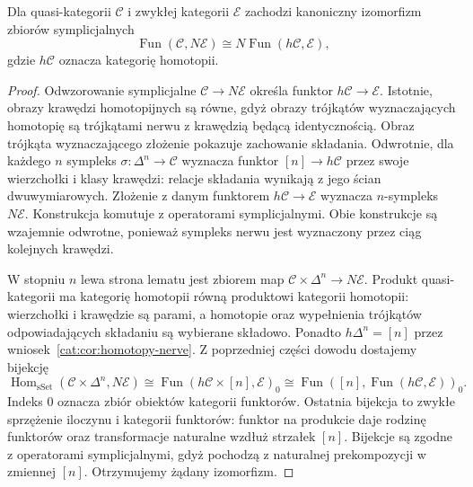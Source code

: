\begin{lemat}\label{cat:lem:infty-localization-ordinary-target}
Dla quasi-kategorii $\mathcal C$ i zwykłej kategorii $\mathcal E$ zachodzi kanoniczny izomorfizm zbiorów symplicjalnych
\[
 \operatorname{Fun}(\mathcal C,N\mathcal E)\cong
 N\operatorname{Fun}(h\mathcal C,\mathcal E),
\]
gdzie $h\mathcal C$ oznacza kategorię homotopii.
\end{lemat}
\begin{proof}
Odwzorowanie symplicjalne $\mathcal C\to N\mathcal E$ określa funktor $h\mathcal C\to\mathcal E$. Istotnie, obrazy krawędzi homotopijnych są równe, gdyż obrazy trójkątów wyznaczających homotopię są trójkątami nerwu z krawędzią będącą identycznością. Obraz trójkąta wyznaczającego złożenie pokazuje zachowanie składania. Odwrotnie, dla każdego $n$ sympleks $\sigma:\Delta^n\to\mathcal C$ wyznacza funktor $[n]\to h\mathcal C$ przez swoje wierzchołki i klasy krawędzi: relacje składania wynikają z jego ścian dwuwymiarowych. Złożenie z danym funktorem $h\mathcal C\to\mathcal E$ wyznacza $n$-sympleks $N\mathcal E$. Konstrukcja komutuje z operatorami symplicjalnymi. Obie konstrukcje są wzajemnie odwrotne, ponieważ sympleks nerwu jest wyznaczony przez ciąg kolejnych krawędzi.

W stopniu $n$ lewa strona lematu jest zbiorem map $\mathcal C\times\Delta^n\to N\mathcal E$. Produkt quasi-kategorii ma kategorię homotopii równą produktowi kategorii homotopii: wierzchołki i krawędzie są parami, a homotopie oraz wypełnienia trójkątów odpowiadających składaniu są wybierane składowo. Ponadto $h\Delta^n=[n]$ przez wniosek~\ref{cat:cor:homotopy-nerve}. Z poprzedniej części dowodu dostajemy bijekcję
\[
 \operatorname{Hom}_{\mathrm{sSet}}(\mathcal C\times\Delta^n,N\mathcal E)
 \cong\operatorname{Fun}(h\mathcal C\times[n],\mathcal E)_0
 \cong\operatorname{Fun}([n],\operatorname{Fun}(h\mathcal C,\mathcal E))_0.
\]
Indeks $0$ oznacza zbiór obiektów kategorii funktorów. Ostatnia bijekcja to zwykłe sprzężenie iloczynu i kategorii funktorów: funktor na produkcie daje rodzinę funktorów oraz transformacje naturalne wzdłuż strzałek $[n]$. Bijekcje są zgodne z operatorami symplicjalnymi, gdyż pochodzą z naturalnej prekompozycji w zmiennej $[n]$. Otrzymujemy żądany izomorfizm.
\end{proof}

